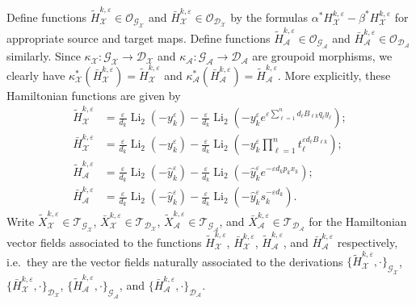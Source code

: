 \documentclass{amsart}
\numberwithin{equation}{section}
\newcommand{\cA}{\mathcal{A}}
\newcommand{\cG}{\mathcal{G}}
\renewcommand{\cD}{\mathcal{D}}
\newcommand{\cO}{\mathcal{O}}
\newcommand{\cX}{\mathcal{X}}
\newcommand{\cT}{\mathcal{T}}
\newcommand{\Li}{\operatorname{Li}}
\begin{document}
Define functions $\tilde H_\cX^{k,\varepsilon}\in\cO_{\cG_\cX}$ and $\bar H_\cX^{k,\varepsilon}\in\cO_{\cD_\cX}$ by the formulas $\alpha^* H_\cX^{k,\varepsilon}-\beta^* H_\cX^{k,\varepsilon}$ for appropriate source and target maps. 
Define functions $\tilde H_\cA^{k,\varepsilon}\in\cO_{\cG_\cA}$ and $\bar H_\cA^{k,\varepsilon}\in\cO_{\cD_\cA}$ similarly.
Since $\kappa_\cX:\cG_\cX\to\cD_\cX$ and $\kappa_\cA:\cG_\cA\to\cD_\cA$ are groupoid morphisms, we clearly have $\kappa_\cX^*(\bar H_\cX^{k,\varepsilon})=\tilde H_\cX^{k,\varepsilon}$ and $\kappa_\cA^*(\bar H_\cA^{k,\varepsilon})=\tilde H_\cA^{k,\varepsilon}$.
More explicitly, these Hamiltonian functions are given by
\begin{align*}
  \tilde H_\cX^{k,\varepsilon}&=\frac{\varepsilon}{d_k}\Li_2(-y_k^\varepsilon)-\frac{\varepsilon}{d_k}\Li_2\left(-y_k^\varepsilon e^{\varepsilon\sum_{\ell=1}^n d_\ell B_{\ell k}q_\ell y_\ell}\right);\\
  \bar H_\cX^{k,\varepsilon}&=\frac{\varepsilon}{d_k}\Li_2(-y_k^\varepsilon)-\frac{\varepsilon}{d_k}\Li_2\left(-y_k^\varepsilon\prod_{\ell=1}^n t_\ell^{\varepsilon d_\ell B_{\ell k}}\right);\\
  \tilde H_\cA^{k,\varepsilon}&=\frac{\varepsilon}{d_k}\Li_2(-\hat y_k^\varepsilon)-\frac{\varepsilon}{d_k}\Li_2\left(-\hat y_k^\varepsilon e^{-\varepsilon d_kp_kx_k}\right);\\
  \bar H_\cA^{k,\varepsilon}&=\frac{\varepsilon}{d_k}\Li_2(-\hat y_k^\varepsilon)-\frac{\varepsilon}{d_k}\Li_2\left(-\hat y_k^\varepsilon s_k^{-\varepsilon d_k}\right).
\end{align*}
Write $\tilde X_\cX^{k,\varepsilon}\in\cT_{\cG_\cX}$, $\bar X_\cX^{k,\varepsilon}\in\cT_{\cD_\cX}$, $\tilde X_\cA^{k,\varepsilon}\in\cT_{\cG_\cA}$, and $\bar X_\cA^{k,\varepsilon}\in\cT_{\cD_\cA}$ for the Hamiltonian vector fields associated to the functions $\tilde H_\cX^{k,\varepsilon}$, $\bar H_\cX^{k,\varepsilon}$, $\tilde H_\cA^{k,\varepsilon}$, and $\bar H_\cA^{k,\varepsilon}$ respectively, i.e.\ they are the vector fields naturally associated to the derivations $\{\tilde H_\cX^{k,\varepsilon},\cdot\}_{\cG_\cX}$, $\{\bar H_\cX^{k,\varepsilon},\cdot\}_{\cD_\cX}$, $\{\tilde H_\cA^{k,\varepsilon},\cdot\}_{\cG_\cA}$, and $\{\bar H_\cA^{k,\varepsilon},\cdot\}_{\cD_\cA}$.
\end{document}
